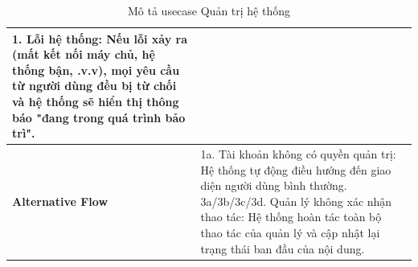 \documentclass[a4paper]{article}
\begin{document}
\begin{table}[h!]
\begin{tabularx}{\textwidth}{|l|X|}
  1. Lỗi hệ thống: Nếu lỗi xảy ra (mất kết nối máy chủ, hệ thống bận, .v.v), mọi yêu cầu từ người dùng đều bị từ chối và hệ thống sẽ hiển thị thông báo "đang trong quá trình bảo trì". \\ \hline
\textbf{Alternative Flow} 
& 1a. Tài khoản không có quyền quản trị: Hệ thống tự động điều hướng đến giao diện người dùng bình thường. \newline
  3a/3b/3c/3d. Quản lý không xác nhận thao tác: Hệ thống hoàn tác toàn bộ thao tác của quản lý và cập nhật lại trạng thái ban đầu của nội dung. \\ \hline
\end{tabularx}
\caption{Mô tả usecase Quản trị hệ thống}
\end{table}
\end{document}
